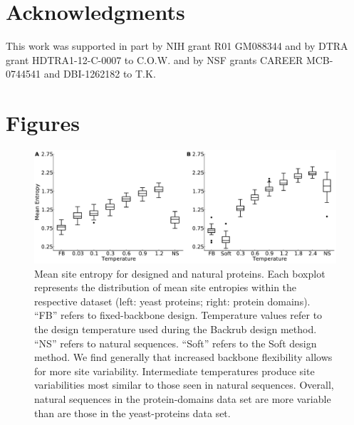 \documentclass[12pt]{article}
\begin{document}
\section{Acknowledgments}

This work was supported in part by NIH grant R01 GM088344 and by DTRA grant HDTRA1-12-C-0007 to C.O.W. and by NSF grants CAREER MCB-0744541 and DBI-1262182 to T.K. 


\cleardoublepage

\section{Figures}

\begin{figure}[H]
\centerline{\includegraphics[width = 6in]{figures/Mean_Entropy_vs_Temp_Combo_Boxplot.pdf}} %
\caption{Mean site entropy for designed and natural proteins. Each boxplot represents the distribution of mean site entropies within the respective dataset (left: yeast proteins; right: protein domains). ``FB'' refers to fixed-backbone design. Temperature values refer to the design temperature used during the Backrub design method. ``NS'' refers to natural sequences. ``Soft'' refers to the Soft design method. We find generally that increased backbone flexibility allows for more site variability. Intermediate temperatures produce site variabilities most similar to those seen in natural sequences. Overall, natural sequences in the protein-domains data set are more variable than are those in the yeast-proteins data set.}
\label{MeanEntropyComparison}
\end{figure}
\end{document}
